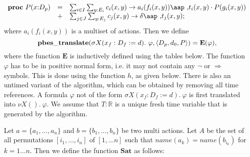 \documentclass{article}
\begin{document}
\begin{equation*}
\begin{array}{lrl}
\mathbf{proc}~P(x{:}D_{p}) & = & \sum_{i\in
I}\sum_{y:E_{i}}c_{i}(x,y)\rightarrow a_{i}(f_{i}(x,y))\mbox{\aap ,}%
t_{i}(x,y)\cdot P(g_{i}(x,y)) \\
& + & \sum_{j\in J}\sum_{y:E_{j}}c_{j}(x,y)\rightarrow \delta \mbox{\aap ,}%
t_{j}(x,y);%
\end{array}%
\end{equation*}%
where $a_{i}(f_{i}(x,y))$ is a multiset of actions. Then we define
\begin{equation*}
\mathbf{pbes\_translate}(\sigma X(x_{f}:D_{f}:=d).~\varphi ,\langle {%
D_{p},d_{0},P}\rangle )=\mathbf{E}(\varphi ),
\end{equation*}%
where the function $\mathbf{E}$ is inductively defined using the tables
below. The function $\varphi $ has to be in positive normal form, i.e. it
may not contain any $\lnot $ or $\Rightarrow $ symbols. This is done using
the function $h$, as given below. There is also an untimed variant of the
algorithm, which can be obtained by removing all time references. A formula $%
\varphi $ not of the form $\sigma X(x_{f}:D_{f}:=d).~\varphi $ is first
translated into $\nu X().~\varphi $. We assume that $T:\mathbb{R}$ is a
unique fresh time variable that is generated by the algorithm.

\vspace{1cm}

Let $a=\{a_{1},\ldots ,a_{n}\}$ and $b=\{b_{1},\ldots ,b_{n}\}$ be two multi
actions. Let $A$ be the set of all permutations $[i_{1},\ldots ,i_{n}]$ of $%
[1,\ldots n]$ such that $name(a_{k})=name(b_{i_{k}})$ for $k=1\ldots n$.
Then we define the function $\mathbf{Sat}$ as follows:
\end{document}
